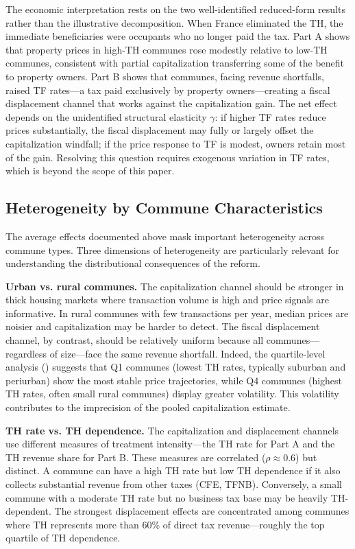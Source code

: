 \documentclass[12pt]{article}
\begin{document}
The economic interpretation rests on the two well-identified reduced-form results rather than the illustrative decomposition. When France eliminated the TH, the immediate beneficiaries were occupants who no longer paid the tax. Part A shows that property prices in high-TH communes rose modestly relative to low-TH communes, consistent with partial capitalization transferring some of the benefit to property owners. Part B shows that communes, facing revenue shortfalls, raised TF rates---a tax paid exclusively by property owners---creating a fiscal displacement channel that works against the capitalization gain. The net effect depends on the unidentified structural elasticity $\gamma$: if higher TF rates reduce prices substantially, the fiscal displacement may fully or largely offset the capitalization windfall; if the price response to TF is modest, owners retain most of the gain. Resolving this question requires exogenous variation in TF rates, which is beyond the scope of this paper.

\subsection{Heterogeneity by Commune Characteristics}

The average effects documented above mask important heterogeneity across commune types. Three dimensions of heterogeneity are particularly relevant for understanding the distributional consequences of the reform.

\textbf{Urban vs. rural communes.} The capitalization channel should be stronger in thick housing markets where transaction volume is high and price signals are informative. In rural communes with few transactions per year, median prices are noisier and capitalization may be harder to detect. The fiscal displacement channel, by contrast, should be relatively uniform because all communes---regardless of size---face the same revenue shortfall. Indeed, the quartile-level analysis () suggests that Q1 communes (lowest TH rates, typically suburban and periurban) show the most stable price trajectories, while Q4 communes (highest TH rates, often small rural communes) display greater volatility. This volatility contributes to the imprecision of the pooled capitalization estimate.

\textbf{TH rate vs. TH dependence.} The capitalization and displacement channels use different measures of treatment intensity---the TH rate for Part A and the TH revenue share for Part B. These measures are correlated ($\rho \approx 0.6$) but distinct. A commune can have a high TH rate but low TH dependence if it also collects substantial revenue from other taxes (CFE, TFNB). Conversely, a small commune with a moderate TH rate but no business tax base may be heavily TH-dependent. The strongest displacement effects are concentrated among communes where TH represents more than 60\% of direct tax revenue---roughly the top quartile of TH dependence.
\end{document}
